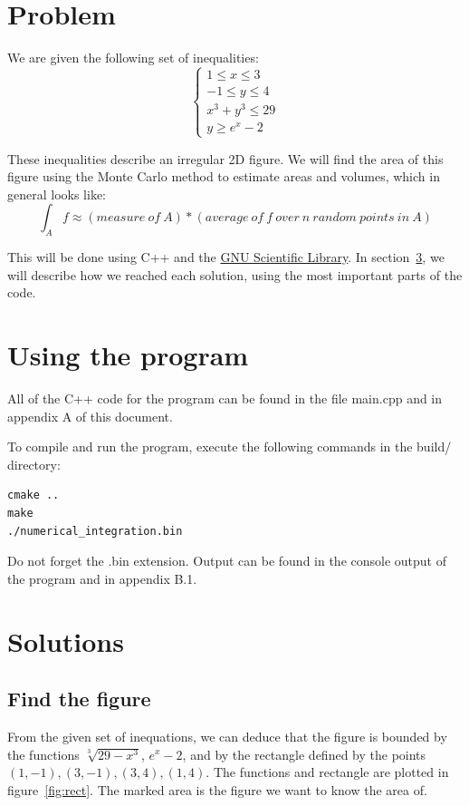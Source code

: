 \documentclass[11pt, a4paper, titlepage, openright]{article}
\begin{document}

\tableofcontents
\newpage

\section{Problem}
    We are given the following set of inequalities:
        \[ \begin{cases}
            1 \leq x \leq 3 \\
            -1 \leq y \leq 4 \\
            x^3 + y^3 \leq 29 \\
            y \geq e^x - 2
        \end{cases} \]

    These inequalities describe an irregular 2D figure. We will find the area of this figure using the Monte Carlo method to estimate areas and volumes, which in general looks like:
    \[ \int_{A}^{}f \approx (measure\ of\ A) * (average\ of\ f\ over\ n\ random\ points\ in\ A) \]

    \bigskip
    This will be done using C++ and the \href{http://www.gnu.org/software/gsl/}{GNU Scientific Library}. 
    In section~\ref{sec:solutions}, we will describe how we reached each solution, using the most important parts of the code.

\bigskip
\bigskip
\section{Using the program}
    All of the C++ code for the program can be found in the file main.cpp and in appendix A of this document.

    To compile and run the program, execute the following commands in the build/ directory:
\begin{lstlisting}
cmake ..
make
./numerical_integration.bin
\end{lstlisting}
    Do not forget the .bin extension.
    Output can be found in the console output of the program and in appendix B.1.
    
\newpage
\section{Solutions}
\label{sec:solutions}
    \subsection{Find the figure}
        From the given set of inequations, we can deduce that the figure is bounded by the functions
        \( \sqrt[3]{29 - x^3} \), \( e^x -2 \), and by the rectangle defined by the points \( (1, -1), (3, -1), (3, 4), (1, 4) \).
        The functions and rectangle are plotted in figure~\ref{fig:rect}. The marked area is the figure we want to know the area of.
\end{document}
